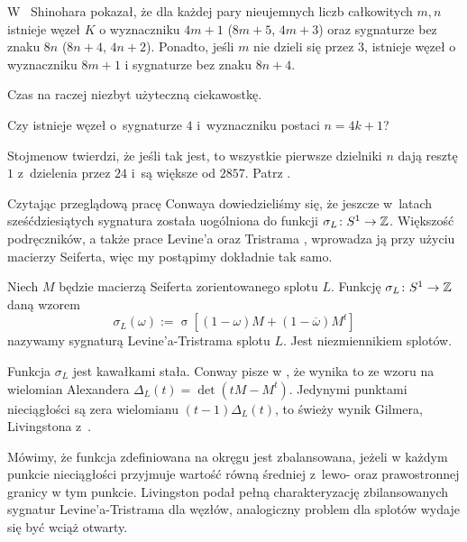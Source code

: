 W~\cite{shinohara71} Shinohara pokazał, że dla każdej pary nieujemnych liczb całkowitych $m, n$ istnieje węzeł $K$ o wyznaczniku $4m+1$ ($8m+5$, $4m+3$) oraz sygnaturze bez znaku $8n$ ($8n+4$, $4n+2$).
%
%
Ponadto, jeśli $m$ nie dzieli się przez $3$, istnieje węzeł o wyznaczniku $8m+1$ i sygnaturze bez znaku $8n+4$.

Czas na raczej niezbyt użyteczną ciekawostkę.

\begin{conjecture}
    Czy istnieje węzeł o~sygnaturze $4$ i~wyznaczniku postaci $n = 4k + 1$?
\end{conjecture}

Stojmenow twierdzi, że jeśli tak jest, to wszystkie pierwsze dzielniki $n$ dają resztę $1$ z~dzielenia przez $24$ i~są większe od $2857$.
%
Patrz \cite[s. 540]{ohtsuki02}.

Czytając przeglądową pracę Conwaya \cite{conway19} dowiedzieliśmy się, że jeszcze w~latach sześćdziesiątych sygnatura została uogólniona do funkcji $\sigma_L \colon S^1 \to \mathbb Z$.
%
Większość podręczników, a także prace Levine'a \cite{levine69} oraz Tristrama \cite{tristram69}, wprowadza ją przy użyciu macierzy Seiferta, więc my postąpimy dokładnie tak samo.
%
%

\begin{definition}
%
    Niech $M$ będzie macierzą Seiferta zorientowanego splotu $L$.
    Funkcję $\sigma_L \colon S^1 \to \mathbb Z$ daną wzorem
    \begin{equation}
        \sigma_L(\omega) := \operatorname{\sigma} [(1-\omega) M + (1 - \overline{\omega})M^t]
    \end{equation}
    nazywamy sygnaturą Levine'a-Tristrama splotu $L$.
    Jest niezmiennikiem splotów.
\end{definition}

Funkcja $\sigma_L$ jest kawałkami stała.
Conway pisze w \cite{conway19}, że wynika to ze wzoru na wielomian Alexandera $\Delta_L(t) = \det(tM - M^t)$.
%
%
Jedynymi punktami nieciągłości są zera wielomianu $(t-1)\Delta_L(t)$, to świeży wynik Gilmera, Livingstona z~\cite{gilmer16}.
%
%

Mówimy, że funkcja zdefiniowana na okręgu jest zbalansowana, jeżeli w każdym punkcie nieciągłości przyjmuje wartość równą średniej z~lewo- oraz prawostronnej granicy w tym punkcie.
Livingston podał pełną charakteryzację zbilansowanych sygnatur Levine'a-Tristrama dla węzłów, analogiczny problem dla splotów wydaje się być wciąż otwarty.

